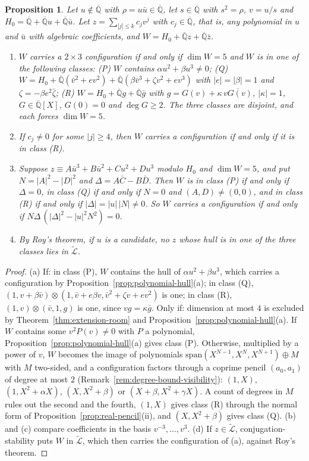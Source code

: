 \documentclass[11pt,a4paper]{article}
\theoremstyle{plain}
\newtheorem{proposition}[theorem]{Proposition}
\theoremstyle{definition}
\newcommand{\Alg}{\overline{\mathbb{Q}}}
\newcommand{\aLogs}{\widetilde{\mathcal{L}}}
\begin{document}
\begin{proposition}\label{prop:laurent-hulls}
Let $u\notin\Alg$ with $\rho=u\bar u\in\Alg$, let $s\in\Alg$ with $s^{2}=\rho$, $v=u/s$ and $H_{0}=\Alg+\Alg u+\Alg\bar u$.
Let $z=\sum_{|j|\leq k}c_{j}v^{j}$ with $c_{j}\in\Alg$, that is, any polynomial in $u$ and $\bar u$ with algebraic
coefficients, and $W=H_{0}+\Alg z+\Alg\bar z$.
\begin{enumerate}[label=\textup{(\alph*)}]
\item $W$ carries a $2\times3$ configuration if and only if $\dim W=5$ and $W$ is in one of the following classes:
(P) $W$ contains $\alpha u^{2}+\beta u^{3}\neq0$; (Q) $W=H_{0}+\Alg(\bar v^{2}+ev^{2})+\Alg(\beta\bar v^{3}+\zeta v^{2}+ev^{3})$
with $|e|=|\beta|=1$ and $\zeta=-\beta e^{2}\bar\zeta$; (R) $W=H_{0}+\Alg g+\Alg\bar g$ with
$g=G(v)+\kappa\,\overline{vG(v)}$, $|\kappa|=1$, $G\in\Alg[X]$, $G(0)=0$ and $\deg G\geq2$. The three classes are
disjoint, and each forces $\dim W=5$.
\item If $c_{j}\neq0$ for some $|j|\geq4$, then $W$ carries a configuration if and only if it is in class (R).
\item Suppose $z\equiv A\bar u^{3}+B\bar u^{2}+Cu^{2}+Du^{3}$ modulo $H_{0}$ and $\dim W=5$, and put $N=|A|^{2}-|D|^{2}$
and $\Delta=A\bar C-B\bar D$. Then $W$ is in class (P) if and only if $\Delta=0$, in class (Q) if and only if $N=0$
and $(A,D)\neq(0,0)$, and in class (R) if and only if $|\Delta|=|u|\,|N|\neq0$. So $W$ carries a configuration if and
only if $N\Delta\,(|\Delta|^{2}-|u|^{2}N^{2})=0$.
\item By Roy's theorem, if $u$ is a candidate, no $z$ whose hull is in one of the three classes lies in $\aLogs$.
\end{enumerate}
\end{proposition}

\begin{proof}
(a) If: in class (P), $W$ contains the hull of $\alpha u^{2}+\beta u^{3}$, which carries a configuration by
Proposition~\ref{prop:polynomial-hull}(a); in class (Q), $(1,v+\beta\bar v)\otimes(1,\bar v+e\beta v,\bar v^{2}+\zeta v+ev^{2})$
is one; in class (R), $(1,v)\otimes(\bar v,1,g)$ is one, since $vg=\kappa\bar g$. Only if: dimension at most $4$ is
excluded by Theorem~\ref{thm:extension-room} and Proposition~\ref{prop:polynomial-hull}(a). If $W$ contains some
$v^{2}P(v)\neq0$ with $P$ a polynomial, Proposition~\ref{prop:polynomial-hull}(a) gives class (P). Otherwise, multiplied by
a power of $v$, $W$ becomes the image of polynomials $\mathrm{span}(X^{N-1},X^{N},X^{N+1})\oplus M$ with $M$ two-sided, and a
configuration factors through a coprime pencil $(a_{0},a_{1})$ of degree at most $2$
(Remark~\ref{rem:degree-bound-visibility}): $(1,X)$, $(1,X^{2}+\alpha X)$, $(X,X^{2}+\beta)$ or $(X+\beta,X^{2}+\gamma X)$. A
count of degrees in $M$ rules out the second and the fourth, $(1,X)$ gives class (R) through the normal form of
Proposition~\ref{prop:real-pencil}(ii), and $(X,X^{2}+\beta)$ gives class (Q). (b) and (c) compare coefficients in the
basis $v^{-3},\dots,v^{3}$. (d) If $z\in\aLogs$, conjugation-stability puts $W$ in $\aLogs$, which then carries the
configuration of (a), against Roy's theorem.
\end{proof}
\end{document}
